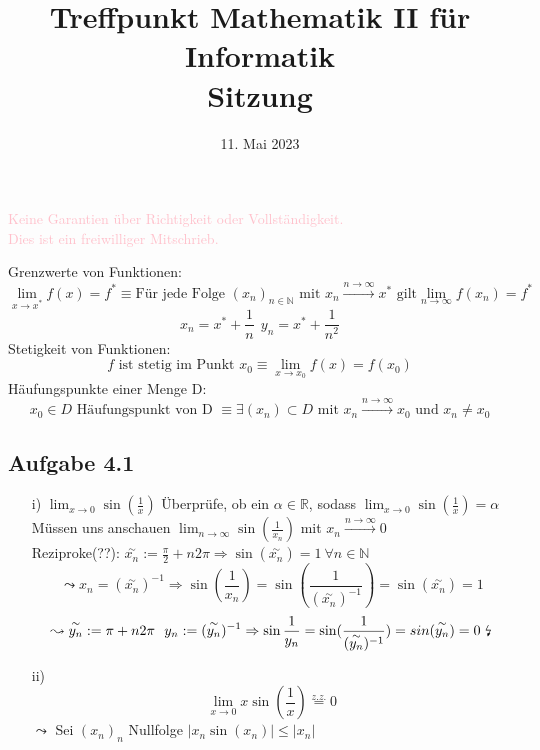 \documentclass[
    accentcolor=pink,
    boxarc,
    dark_mode,
    logofile=enmpty
]{rubos-tuda-template}
\date{11. Mai 2023}
\title[trans rights <3]{Treffpunkt Mathematik II für Informatik \\ Sitzung \getSheetnumber{}}
\begin{document}
    \maketitle{}

    \begin{anmerkung}
        \huge{\textcolor{pink}{Keine Garantien über Richtigkeit oder Vollständigkeit. \\ Dies ist ein freiwilliger Mitschrieb.}}
    \end{anmerkung}

    Grenzwerte von Funktionen:
    \[\lim_{x \rightarrow x^*} f(x) = f^* \equiv \text{Für jede Folge $(x_n)_{n \in \mathbb{N}}$ mit $x_n \overset{n \rightarrow \infty}{\longrightarrow} x^*$ gilt} \lim_{n \rightarrow \infty} f(x_n) = f^*\]
    \[ x_n = x^* + \frac{1}{n} \ \ y_n = x^*+\frac{1}{n^2}\]
    Stetigkeit von Funktionen:
    \[f \text{ ist stetig im Punkt } x_0 \equiv \lim_{x \rightarrow x_0}f(x) = f(x_0)\]
    Häufungspunkte einer Menge D:
    \[x_0 \in D \text{ Häufungspunkt von D } \equiv \exists (x_n) \subset D \text{ mit } x_n \overset{n \rightarrow \infty}{\longrightarrow} x_0 \text{ und } x_n \ne x_0\]

    \subsection*{Aufgabe 4.1}
    \begin{enumerate}
        \item[i)]
            $\lim_{x \rightarrow 0} \sin(\frac{1}{x})$ Überprüfe, ob ein $\alpha \in \mathbb{R}$, sodass $\lim_{x \rightarrow 0} \sin(\frac{1}{x}) = \alpha$\\
            Müssen uns anschauen $\lim_{n \rightarrow \infty} \sin(\frac{1}{x_n})$ mit $x_n \overset{n \rightarrow \infty}{\longrightarrow} 0$\\
            Reziproke(??): $\overset{\sim}{x_n} := \frac{\pi}{2} +n2\pi \Rightarrow \sin(\overset{\sim}{x_n}) = 1\ \forall n \in \mathbb{N}$
            \[\leadsto x_n = (\overset{\sim}{x_n})^{-1} \Rightarrow \sin(\frac{1}{x_n}) = \sin(\frac{1}{(\overset{\sim}{x_n})^{-1}}) = \sin(\overset{\sim}{x_n}) = 1\]
            \[\leadsto \overset{\sim}{y_n} := \pi + n2\pi\ \ y_n := (\overset{\sim}{y_n})^{-1} \Rightarrow \sin\frac{1}{y_n} = \sin(\frac{1}{(\overset{\sim}{y_n})^{-1}}) = sin(\overset{\sim}{y_n}) = 0\ \text{\lightning}\]
        \item[ii)]
            \[\lim_{x \rightarrow 0} x\sin(\frac{1}{x}) \overset{z. z.}{=} 0\]
            $\leadsto$ Sei $(x_n)_n$ Nullfolge $|x_n\sin(x_n)| \le |x_n|$
    \end{enumerate}
\end{document}
